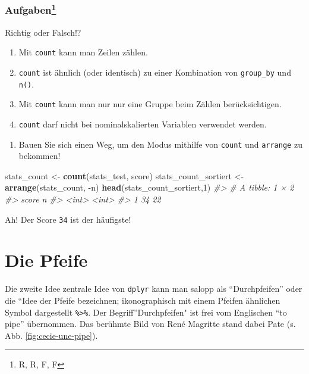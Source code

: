 \documentclass[12pt,ngerman,]{book}
\makeatletter
\newenvironment{Shaded}{\begin{snugshade}}{\end{snugshade}}
\newcommand{\KeywordTok}[1]{\textcolor[rgb]{0.13,0.29,0.53}{\textbf{{#1}}}}
\newcommand{\DecValTok}[1]{\textcolor[rgb]{0.00,0.00,0.81}{{#1}}}
\newcommand{\StringTok}[1]{\textcolor[rgb]{0.31,0.60,0.02}{{#1}}}
\newcommand{\CommentTok}[1]{\textcolor[rgb]{0.56,0.35,0.01}{\textit{{#1}}}}
\newcommand{\NormalTok}[1]{{#1}}
\providecommand{\tightlist}{%
  \setlength{\itemsep}{0pt}\setlength{\parskip}{0pt}}
\let\rmarkdownfootnote\footnote%
\def\footnote{\protect\rmarkdownfootnote}
\newenvironment{kframe}{%
\medskip{}
\setlength{\fboxsep}{.8em}
 \def\at@end@of@kframe{}%
 \ifinner\ifhmode%
  \def\at@end@of@kframe{\end{minipage}}%
  \begin{minipage}{\columnwidth}%
 \fi\fi%
 \def\FrameCommand##1{\hskip\@totalleftmargin \hskip-\fboxsep
 \colorbox{shadecolor}{##1}\hskip-\fboxsep
     \hskip-\linewidth \hskip-\@totalleftmargin \hskip\columnwidth}%
 \MakeFramed {\advance\hsize-\width
   \@totalleftmargin\z@ \linewidth\hsize
   \@setminipage}}%
 {\par\unskip\endMakeFramed%
 \at@end@of@kframe}
\renewenvironment{Shaded}{\begin{kframe}}{\end{kframe}}
\let\BeginKnitrBlock\begin \let\EndKnitrBlock\end
\makeatother
\begin{document}
\subsubsection[Aufgaben]{\texorpdfstring{Aufgaben\footnote{R, R, F, F}}{Aufgaben}}\label{aufgaben-8}

\BeginKnitrBlock{rmdexercises}
Richtig oder Falsch!?

\begin{enumerate}
\def\labelenumi{\arabic{enumi}.}
\tightlist
\item
  Mit \texttt{count} kann man Zeilen zählen.
\item
  \texttt{count} ist ähnlich (oder identisch) zu einer Kombination von
  \texttt{group\_by} und \texttt{n()}.
\item
  Mit \texttt{count} kann man nur nur eine Gruppe beim Zählen
  berücksichtigen.
\item
  \texttt{count} darf nicht bei nominalskalierten Variablen verwendet
  werden.
\end{enumerate}
\EndKnitrBlock{rmdexercises}

\begin{enumerate}
\def\labelenumi{\arabic{enumi}.}
\tightlist
\item
  Bauen Sie sich einen Weg, um den Modus mithilfe von \texttt{count} und
  \texttt{arrange} zu bekommen!
\end{enumerate}

\begin{Shaded}
\begin{Highlighting}[]
\NormalTok{stats_count <-}\StringTok{ }\KeywordTok{count}\NormalTok{(stats_test, score)}
\NormalTok{stats_count_sortiert <-}\StringTok{ }\KeywordTok{arrange}\NormalTok{(stats_count, -n)}
\KeywordTok{head}\NormalTok{(stats_count_sortiert,}\DecValTok{1}\NormalTok{)}
\CommentTok{#> # A tibble: 1 × 2}
\CommentTok{#>   score     n}
\CommentTok{#>   <int> <int>}
\CommentTok{#> 1    34    22}
\end{Highlighting}
\end{Shaded}

Ah! Der Score \texttt{34} ist der häufigste!

\section{Die Pfeife}\label{die-pfeife}

Die zweite Idee zentrale Idee von \texttt{dplyr} kann man salopp als
``Durchpfeifen'' oder die ``Idee der
Pfeife bezeichnen; ikonographisch mit einem Pfeifen
ähnlichen Symbol dargestellt \texttt{\%\textgreater{}\%}. Der
Begriff''Durchpfeifen" ist frei vom Englischen ``to pipe'' übernommen.
Das berühmte Bild von René Magritte stand dabei Pate (s. Abb.
\ref{fig:cecie-une-pipe}).
\end{document}
